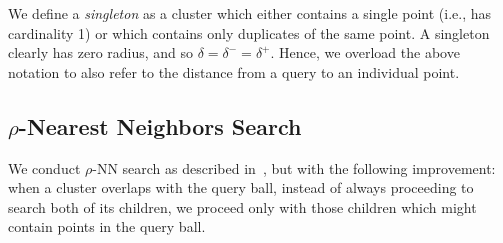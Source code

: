 
We define a \textit{singleton} as a cluster which either contains a single point (i.e., has cardinality 1) or which contains only duplicates of the same point.
A singleton clearly has zero radius, and so $\delta = \delta^{-} = \delta^{+}$.
Hence, we overload the above notation to also refer to the distance from a query to an individual point.


\subsection{\texorpdfstring{$\rho$}{p}-Nearest Neighbors Search}
\label{sec:methods:rnn-search}

We conduct $\rho$-NN search as described in~\cite{ishaq2019clustered}, but with the following improvement:
when a cluster overlaps with the query ball, instead of always proceeding to search both of its children, we proceed only with those children which might contain points in the query ball.

